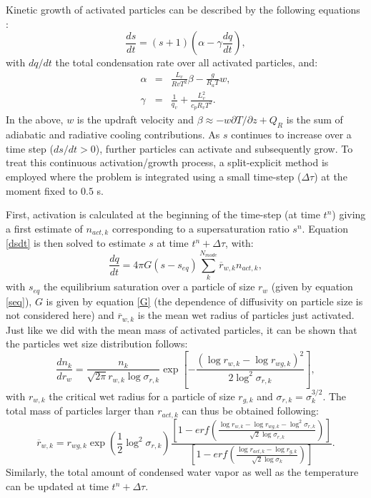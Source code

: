 \documentclass[12pt,A4,french]{article}
\begin{document}
Kinetic growth of activated particles can be described by the following equations \cite{NS2003, Gal2011}:
\begin{equation}
    \frac{ds}{dt} = \left(s+1\right)\left(\alpha - \gamma\frac{dq}{dt}\right),
    \label{dsdt}
\end{equation}
with $dq/dt$ the total condensation rate over all activated particles, and:
\begin{eqnarray}
    \alpha &=& \frac{L_v}{Rv T^2}\beta - \frac{g}{R_a T} w, \\
    \gamma &=& \frac{1}{q_v} + \frac{L_v^2}{c_p R_v T^2}.
\end{eqnarray}
In the above, $w$ is the updraft velocity and $\beta \approx -w \partial T/\partial z + Q_R$ is the sum of adiabatic and radiative cooling contributions. As $s$ continues to increase over a time step ($ds/dt > 0$), further particles can activate and subsequently grow. To treat this continuous activation/growth process, a split-explicit method is employed where the problem is integrated using a small time-step ($\Delta\tau$) at the moment fixed to $0.5$ s.

First, activation is calculated at the beginning of the time-step (at time $t^n$) giving a first estimate of $n_{act,k}$ corresponding to a supersaturation ratio $s^n$. Equation \ref{dsdt} is then solved to estimate $s$ at time $t^n+\Delta\tau$, with:
\begin{equation}
    \frac{dq}{dt} = 4\pi G \left(s - s_{eq}\right) \sum_{k}^{N_{mode}} \overline{r}_{w,k} n_{act,k},
\end{equation}
with $s_{eq}$ the equilibrium saturation over a particle of size $r_{w}$ (given by equation \ref{seq}), $G$ is given by equation \ref{G} (the dependence of diffusivity on particle size is not considered here) and $\overline{r}_{w,k}$ is the mean wet radius of particles just activated. Just like we did with the mean mass of activated particles, it can be shown that the particles wet size distribution follows:
\begin{equation}
    \frac{dn_k}{dr_w} = \frac{n_k}{\sqrt{2\pi}r_{w,k}\log\sigma_{r,k}}\exp\left[-\frac{\left(\log r_{w,k} - \log r_{wg,k}\right)^2}{2\log^2\sigma_{r,k}}\right],
\end{equation}
with $r_{w,k}$ the critical wet radius for a particle of size $r_{g,k}$ and $\sigma_{r,k} = \sigma_k^{3/2}$. The total mass of particles larger than $r_{act,k}$ can thus be obtained following:
\begin{equation}
    \overline{r}_{w,k} = r_{wg,k} \exp\left(\frac{1}{2}\log^2\sigma_{r,k}\right) \frac{\left[1 - erf\left(\frac{\log r_{w,k} - \log r_{wg,k} - \log^2\sigma_{r,k}}{\sqrt{2}\log\sigma_{r,k}}\right)\right]}{\left[1 - erf \left(\frac{\log r_{act,k} - \log r_{g,k}}{\sqrt{2}\log\sigma_k}\right)\right]}.
\end{equation}
Similarly, the total amount of condensed water vapor as well as the temperature can be updated at time $t^n + \Delta\tau$. 
\end{document}
